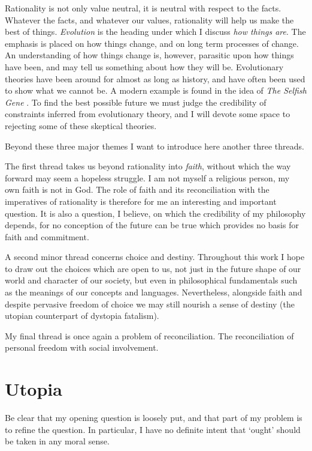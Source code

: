 Rationality is not only value neutral, it is neutral with respect to the facts.
Whatever the facts, and whatever our values, rationality will help us make the best of things.
{\it Evolution} is the heading under which I discuss {\it how things are}.
The emphasis is placed on how things change, and on long term processes of change.
An understanding of how things change is, however, parasitic upon how things have been, and may tell us something about how they will be.
Evolutionary theories have been around for almost as long as history, and have often been used to show what we cannot be.
A modern example is found in the idea of {\it The Selfish Gene} \cite{dawkinsSG}.
To find the best possible future we must judge the credibility of constraints inferred from evolutionary theory, and I will devote some space to rejecting some of these skeptical theories.

Beyond these three major themes I want to introduce here another three threads.

The first thread takes us beyond rationality into {\it faith}, without which the way forward may seem a hopeless struggle.
I am not myself a religious person, my own faith is not in God.
The role of faith and its reconciliation with the imperatives of rationality is therefore for me an interesting and important question.
It is also a question, I believe, on which the credibility of my philosophy depends, for no conception of the future can be true which provides no basis for faith and commitment.

A second minor thread concerns choice and destiny.
Throughout this work I hope to draw out the choices which are open to us, not just in the future shape of our world and character of our society, but even in philosophical fundamentals such as the meanings of our concepts and languages.
Nevertheless, alongside faith and despite pervasive freedom of choice we may still nourish a sense of destiny (the utopian counterpart of dystopia fatalism).

My final thread is once again a problem of reconciliation.
The reconciliation of personal freedom with social involvement.

\section{Utopia}

Be clear that my opening question is loosely put, and that part of my problem is to refine the question. 
In particular, I have no definite intent that `ought' should be taken in any moral sense.

